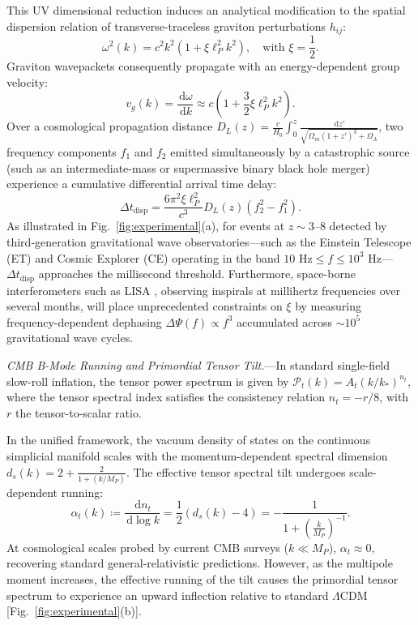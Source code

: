 \documentclass[aps,prl,reprint,twocolumn,superscriptaddress,nofootinbib,floatfix]{revtex4-2}
\newcommand{\dif}{\,\mathrm{d}}
\begin{document}
This UV dimensional reduction induces an analytical modification to the spatial dispersion relation of transverse-traceless graviton perturbations $h_{ij}$:
\begin{equation}
    \label{eq:dispersion}
    \omega^2(k) = c^2 k^2 \left( 1 + \xi \ell_P^2 k^2 \right), \quad \text{with } \xi = \frac{1}{2}.
\end{equation}
Graviton wavepackets consequently propagate with an energy-dependent group velocity:
\begin{equation}
    v_g(k) = \frac{\dif \omega}{\dif k} \approx c \left( 1 + \frac{3}{2}\xi \ell_P^2 k^2 \right).
\end{equation}
Over a cosmological propagation distance $D_L(z) = \frac{c}{H_0} \int_0^z \frac{\dif z'}{\sqrt{\Omega_m(1+z')^3 + \Omega_\Lambda}}$, two frequency components $f_1$ and $f_2$ emitted simultaneously by a catastrophic source (such as an intermediate-mass or supermassive binary black hole merger) experience a cumulative differential arrival time delay:
\begin{equation}
    \label{eq:delta_t}
    \Delta t_{\mathrm{disp}} = \frac{6 \pi^2 \xi \ell_P^2}{c^3} D_L(z) \left( f_2^2 - f_1^2 \right).
\end{equation}
As illustrated in Fig.~\ref{fig:experimental}(a), for events at $z \sim 3$--$8$ detected by third-generation gravitational wave observatories—such as the Einstein Telescope (ET) \cite{punturo2010einstein} and Cosmic Explorer (CE) \cite{reitze2019cosmic} operating in the band $10\text{ Hz} \le f \le 10^3\text{ Hz}$—$\Delta t_{\mathrm{disp}}$ approaches the millisecond threshold. Furthermore, space-borne interferometers such as LISA \cite{amaro2017laser}, observing inspirals at millihertz frequencies over several months, will place unprecedented constraints on $\xi$ by measuring frequency-dependent dephasing $\Delta \Psi(f) \propto f^3$ accumulated across $\sim 10^5$ gravitational wave cycles.

\emph{CMB B-Mode Running and Primordial Tensor Tilt.}---In standard single-field slow-roll inflation, the tensor power spectrum is given by $\mathcal{P}_t(k) = A_t (k / k_*)^{n_t}$, where the tensor spectral index satisfies the consistency relation $n_t = -r / 8$, with $r$ the tensor-to-scalar ratio.

In the unified framework, the vacuum density of states on the continuous simplicial manifold scales with the momentum-dependent spectral dimension $d_s(k) = 2 + \frac{2}{1 + (k/M_P)}$. The effective tensor spectral tilt undergoes scale-dependent running:
\begin{equation}
    \label{eq:tensor_running}
    \alpha_t(k) \coloneqq \frac{\dif n_t}{\dif \log k} = \frac{1}{2} \left( d_s(k) - 4 \right) = -\frac{1}{1 + \left( \frac{k}{M_P} \right)^{-1}}.
\end{equation}
At cosmological scales probed by current CMB surveys ($k \ll M_P$), $\alpha_t \approx 0$, recovering standard general-relativistic predictions. However, as the multipole moment increases, the effective running of the tilt causes the primordial tensor spectrum to experience an upward inflection relative to standard $\Lambda\mathrm{CDM}$ [Fig.~\ref{fig:experimental}(b)].
\end{document}
